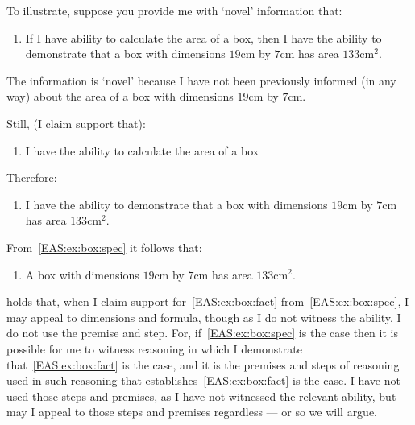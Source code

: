 \begin{note}
  To illustrate, suppose you provide me with `novel' information that:
  \begin{enumerate}[label=\emph{A}\arabic*., ref=(\emph{A}\arabic*), series=EAS_counter]
  \item\label{EAS:ex:box:if} If I have ability to calculate the area of a box, then I have the ability to demonstrate that a box with dimensions \(19\text{cm}\) by \(7\text{cm}\) has area \(133\text{cm}^{2}\).
  \end{enumerate}
  The information is `novel' because I have not been previously informed (in any way) about the area of a box with dimensions \(19\text{cm}\) by \(7\text{cm}\).

  Still, (I claim support that):
  \begin{enumerate}[label=\emph{A}\arabic*., ref=(\emph{A}\arabic*), resume*=EAS_counter]
  \item\label{EAS:ex:box:gen} I have the ability to calculate the area of a box
  \end{enumerate}
  Therefore:
  \begin{enumerate}[label=\emph{A}\arabic*., ref=(\emph{A}\arabic*), resume*=EAS_counter]
  \item\label{EAS:ex:box:spec} I have the ability to demonstrate that a box with dimensions \(19\text{cm}\) by \(7\text{cm}\) has area \(133\text{cm}^{2}\).
  \end{enumerate}
  From~\ref{EAS:ex:box:spec} it follows that:
  \begin{enumerate}[label=\emph{A}\arabic*., ref=(\emph{A}\arabic*), resume*=EAS_counter]
  \item\label{EAS:ex:box:fact} A box with dimensions \(19\text{cm}\) by \(7\text{cm}\) has area \(133\text{cm}^{2}\).
  \end{enumerate}
  \EAS{} holds that, when I claim support for~\ref{EAS:ex:box:fact} from~\ref{EAS:ex:box:spec}, I may appeal to dimensions and formula, though as I do not witness the ability, I do not use the premise and step.
  For, if~\ref{EAS:ex:box:spec} is the case then it is possible for me to witness reasoning in which I demonstrate that~\ref{EAS:ex:box:fact} is the case, and it is the premises and steps of reasoning used in such reasoning that establishes~\ref{EAS:ex:box:fact} is the case.
  I have not used those steps and premises, as I have not witnessed the relevant ability, but may I appeal to those steps and premises regardless --- or so we will argue.
\end{note}

